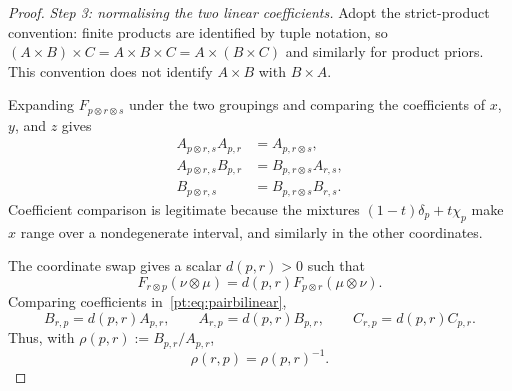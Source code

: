 \documentclass[11pt,a4paper]{article}
\theoremstyle{definition}
\newcommand{\1}{\mathbf 1}
\begin{document}
\begin{proof}
\emph{Step 3: normalising the two linear coefficients.}
Adopt the strict-product convention: finite products are identified by tuple notation, so
$(A\times B)\times C=A\times B\times C=A\times(B\times C)$ and similarly for product priors.  This convention does
not identify $A\times B$ with $B\times A$.

Expanding $F_{p\otimes r\otimes s}$ under the two groupings and comparing the coefficients of $x$, $y$, and $z$ gives
\begin{align}
A_{p\otimes r,s}A_{p,r}&=A_{p,r\otimes s}, \tag{C1}\label{pt:eq:Acoc1}\\
A_{p\otimes r,s}B_{p,r}&=B_{p,r\otimes s}A_{r,s}, \tag{C2}\label{pt:eq:Acoc2}\\
B_{p\otimes r,s}&=B_{p,r\otimes s}B_{r,s}. \tag{C3}\label{pt:eq:Acoc3}
\end{align}
Coefficient comparison is legitimate because the mixtures $(1-t)\delta_p+t\chi_p$ make $x$ range over a nondegenerate
interval, and similarly in the other coordinates.

The coordinate swap gives a scalar $d(p,r)>0$ such that
\[
F_{r\otimes p}(\nu\otimes\mu)=d(p,r)F_{p\otimes r}(\mu\otimes\nu).
\]
Comparing coefficients in~\eqref{pt:eq:pairbilinear},
\[
B_{r,p}=d(p,r)A_{p,r},
\qquad
A_{r,p}=d(p,r)B_{p,r},
\qquad
C_{r,p}=d(p,r)C_{p,r}.
\]
Thus, with $\rho(p,r):=B_{p,r}/A_{p,r}$,
\begin{equation}
\rho(r,p)=\rho(p,r)^{-1}.
\tag{SW}\label{pt:eq:rhoswap}
\end{equation}


\end{proof}
\end{document}
